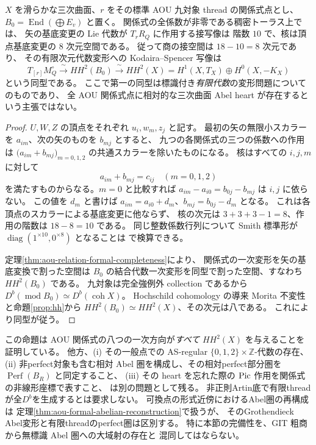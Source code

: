 \begin{proposition}
\label{prop:aou-kodaira-spencer-iso}
$X$ を滑らかな三次曲面、$r$ をその標準 AOU 九対象 thread の関係式点とし、
$B_0=\operatorname{End}(\bigoplus E_v)$ と置く。
関係式の全係数が非零である稠密トーラス上では、
矢の基底変更の Lie 代数が $T_rR_Q$ に作用する接写像は
階数 $10$ で、核は頂点基底変更の $8$ 次元空間である。
従って商の接空間は $18-10=8$ 次元であり、
その有限次元代数変形への Kodaira--Spencer 写像は
\[
 T_{[r]}M_Q^\circ\xrightarrow{\ \sim\ }HH^2(B_0)
 \xrightarrow{\ \sim\ }HH^2(X)
 =H^1(X,T_X)\oplus H^0(X,-K_X)
\]
という同型である。
ここで第一の同型は標識付き\emph{有限代数}の変形問題についてのものであり、
全 AOU 関係式点に相対的な三次曲面 Abel heart が存在するという主張ではない。
\end{proposition}
\begin{proof}
$U,W,Z$ の頂点をそれぞれ $u_i,w_m,z_j$ と記す。
最初の矢の無限小スカラーを $a_{im}$、次の矢のものを $b_{mj}$ とすると、
九つの各関係式の三つの係数への作用は
$\bigl(a_{im}+b_{mj}\bigr)_{m=0,1,2}$ の共通スカラーを除いたものになる。
核はすべての $i,j,m$ に対して
\[
 a_{im}+b_{mj}=c_{ij}\quad(m=0,1,2)
\]
を満たすものからなる。$m=0$ と比較すれば
$a_{im}-a_{i0}=b_{0j}-b_{mj}$ は $i,j$ に依らない。
この値を $d_m$ と書けば
$a_{im}=a_{i0}+d_m$、$b_{mj}=b_{0j}-d_m$ となる。
これは各頂点のスカラーによる基底変更に他ならず、
核の次元は $3+3+3-1=8$、作用の階数は $18-8=10$ である。
同じ整数係数行列について Smith 標準形が
$\operatorname{diag}(1^{\times10},0^{\times8})$ となることは
 で検算できる。

定理\ref{thm:aou-relation-formal-completeness}により、
関係式の一次変形を矢の基底変換で割った空間は
$B_0$ の結合代数一次変形を同型で割った空間、すなわち $HH^2(B_0)$ である。
九対象は完全強例外 collection であるから
$D^b(\operatorname{mod}B_0)\simeq D^b(\operatorname{coh}X)$。
Hochschild cohomology の導来 Morita 不変性と命題\ref{prop:hh}から
$HH^2(B_0)\simeq HH^2(X)$、その次元は八である。
これにより同型が従う。
\end{proof}

\begin{remark}[到達した比較と残る心の問題]
\label{rem:relation-vs-heart}
この命題は AOU 関係式の八つの一次方向が\emph{すべて}
$HH^2(X)$ を与えることを証明している。
他方、(i) その一般点での AS-regular $\{0,1,2\}\times\mathbb Z$-代数の存在、
(ii) 非perfect対象も含む相対 Abel 圏を構成し、その相対perfect部分圏を
$\operatorname{Perf}(B_R)$ と同定すること、
(iii) その heart を忘れた際の $\operatorname{Pic}$ 作用を関係式の非線形座標で表すこと、
は別の問題として残る。
非正則Artin底で有限threadが全$D^b$を生成するとは要求しない。
可換点の形式近傍におけるAbel圏の再構成は
定理\ref{thm:aou-formal-abelian-reconstruction}で扱うが、
そのGrothendieck Abel変形と有限threadのperfect圏は区別する。
特に本節の完備性を、GIT 粗商から無標識 Abel 圏への大域射の存在と
混同してはならない。
\end{remark}
